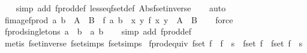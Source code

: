 \begin{isabellebody}
%
\isadelimproof
\ \ %
\endisadelimproof
%
\isatagproof
{}\isamarkupfalse%
\ {\isacharparenleft}simp\ add{\isacharcolon}\ fprod{\isacharunderscore}def\ less{\isacharunderscore}eq{\isacharunderscore}fset{\isacharunderscore}def\ Abs{\isacharunderscore}fset{\isacharunderscore}inverse{\isacharparenright}\isanewline
\ \ \isamarkupfalse%
\ auto%
\endisatagproof
{\isafoldproof}%
%
\isadelimproof
\isanewline
%
\endisadelimproof
\isanewline
{}\isamarkupfalse%
\ fimage{\isacharunderscore}fprod{\isacharcolon}\ {\isachardoublequoteopen}{\isacharparenleft}a{\isacharcomma}\ b{\isacharparenright}\ {\isacharbar}{\isasymin}{\isacharbar}\ A\ {\isacharbar}{\isasymtimes}{\isacharbar}\ B\ {\isasymLongrightarrow}\ f\ a\ b\ {\isacharbar}{\isasymin}{\isacharbar}\ {\isacharparenleft}{\isasymlambda}{\isacharparenleft}x{\isacharcomma}\ y{\isacharparenright}{\isachardot}\ f\ x\ y{\isacharparenright}\ {\isacharbar}{\isacharbackquote}{\isacharbar}\ {\isacharparenleft}A\ {\isacharbar}{\isasymtimes}{\isacharbar}\ B{\isacharparenright}{\isachardoublequoteclose}\isanewline
%
\isadelimproof
\ \ %
\endisadelimproof
%
\isatagproof
{}\isamarkupfalse%
\ force%
\endisatagproof
{\isafoldproof}%
%
\isadelimproof
\isanewline
%
\endisadelimproof
\isanewline
{}\isamarkupfalse%
\ fprod{\isacharunderscore}singletons{\isacharcolon}\ {\isachardoublequoteopen}{\isacharbraceleft}{\isacharbar}a{\isacharbar}{\isacharbraceright}\ {\isacharbar}{\isasymtimes}{\isacharbar}\ {\isacharbraceleft}{\isacharbar}b{\isacharbar}{\isacharbraceright}\ {\isacharequal}\ {\isacharbraceleft}{\isacharbar}{\isacharparenleft}a{\isacharcomma}\ b{\isacharparenright}{\isacharbar}{\isacharbraceright}{\isachardoublequoteclose}\isanewline
%
\isadelimproof
\ \ %
\endisadelimproof
%
\isatagproof
{}\isamarkupfalse%
\ {\isacharparenleft}simp\ add{\isacharcolon}\ fprod{\isacharunderscore}def{\isacharparenright}\isanewline
\ \ \isamarkupfalse%
\ {\isacharparenleft}metis\ fset{\isacharunderscore}inverse\ fset{\isacharunderscore}simps{\isacharparenleft}{}{\isacharparenright}\ fset{\isacharunderscore}simps{\isacharparenleft}{}{\isacharparenright}{\isacharparenright}%
\endisatagproof
{\isafoldproof}%
%
\isadelimproof
\isanewline
%
\endisadelimproof
\isanewline
{}\isamarkupfalse%
\ fprod{\isacharunderscore}equiv{\isacharcolon}\ {\isachardoublequoteopen}{\isacharparenleft}fset\ {\isacharparenleft}f\ {\isacharbar}{\isasymtimes}{\isacharbar}\ f{\isacharprime}{\isacharparenright}\ {\isacharequal}\ s{\isacharparenright}\ {\isacharequal}\ {\isacharparenleft}{\isacharparenleft}{\isacharparenleft}fset\ f{\isacharparenright}\ {\isasymtimes}\ {\isacharparenleft}fset\ f{\isacharprime}{\isacharparenright}{\isacharparenright}\ {\isacharequal}\ s{\isacharparenright}{\isachardoublequoteclose}\isanewline

\end{isabellebody}
